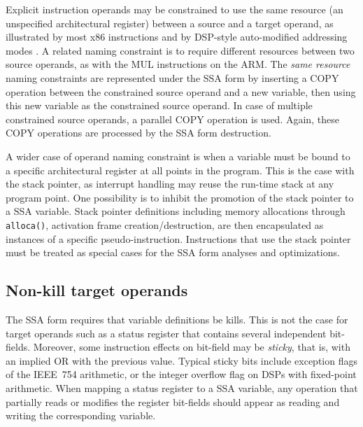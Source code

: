 Explicit instruction operands may be constrained to use the same resource (an
unspecified architectural register) between a source and a target operand, as
illustrated by most x86 instructions \cite{Shanley:2010:Book} and by DSP-style auto-modified addressing
modes \cite{Lee:2003:TODAES}.  A related naming constraint is to require different resources between
two source operands, as with the MUL instructions on the ARM. The \emph{same
resource} naming constraints are represented under the SSA form by inserting a
COPY operation between the constrained source operand and a new variable, then
using this new variable as the constrained source operand. In case of multiple
constrained source operands, a parallel COPY operation is used.  Again, these
COPY operations are processed by the SSA form destruction.

A wider case of operand naming constraint is when a variable must be bound to a
specific architectural register at all points in the program. This is the case
with the stack pointer, as interrupt handling may reuse the run-time stack at
any program point.  One possibility is to inhibit the promotion of the stack
pointer to a SSA variable.  Stack pointer definitions including memory
allocations through \verb|alloca()|, activation frame creation/destruction, are
then encapsulated as instances of a specific pseudo-instruction. Instructions
that use the stack pointer must be treated as special cases for the SSA form
analyses and optimizations.

\subsection{Non-kill target operands} \label{sec:non-kill-target}

The SSA form requires that variable definitions be kills. This is not the case
for target operands such as a status register that contains several independent
bit-fields. Moreover, some instruction effects on bit-field may be \emph{sticky},
that is, with an implied OR with the previous value. Typical sticky bits include
exception flags of the IEEE~754 arithmetic, or the integer overflow flag on DSPs
with fixed-point arithmetic. When mapping a status register to a SSA variable,
any operation that partially reads or modifies the register bit-fields should
appear as reading and writing the corresponding variable.

